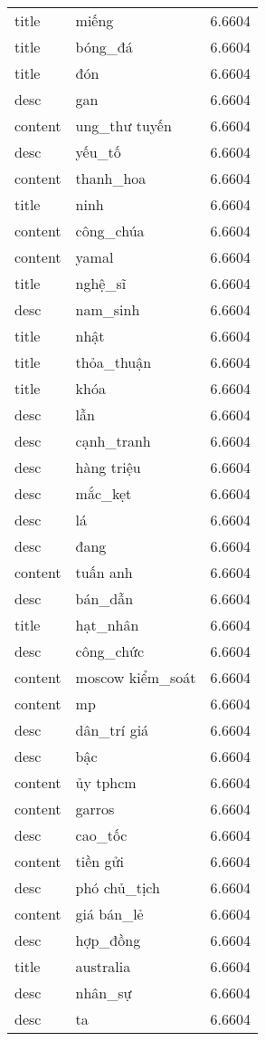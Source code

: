 \documentclass{article}
\begin{document}
\begin{tabular}{lll}
title & miếng & 6.6604\\
title & bóng\_đá & 6.6604\\
title & đón & 6.6604\\
desc & gan & 6.6604\\
content & ung\_thư tuyến & 6.6604\\
desc & yếu\_tố & 6.6604\\
content & thanh\_hoa & 6.6604\\
title & ninh & 6.6604\\
content & công\_chúa & 6.6604\\
content & yamal & 6.6604\\
title & nghệ\_sĩ & 6.6604\\
desc & nam\_sinh & 6.6604\\
title & nhật & 6.6604\\
title & thỏa\_thuận & 6.6604\\
title & khóa & 6.6604\\
desc & lẫn & 6.6604\\
desc & cạnh\_tranh & 6.6604\\
desc & hàng triệu & 6.6604\\
desc & mắc\_kẹt & 6.6604\\
desc & lá & 6.6604\\
desc & đang & 6.6604\\
content & tuấn anh & 6.6604\\
desc & bán\_dẫn & 6.6604\\
title & hạt\_nhân & 6.6604\\
desc & công\_chức & 6.6604\\
content & moscow kiểm\_soát & 6.6604\\
content & mp & 6.6604\\
desc & dân\_trí giá & 6.6604\\
desc & bậc & 6.6604\\
content & ủy tphcm & 6.6604\\
content & garros & 6.6604\\
desc & cao\_tốc & 6.6604\\
content & tiền gửi & 6.6604\\
desc & phó chủ\_tịch & 6.6604\\
content & giá bán\_lẻ & 6.6604\\
desc & hợp\_đồng & 6.6604\\
title & australia & 6.6604\\
desc & nhân\_sự & 6.6604\\
desc & ta & 6.6604\\

\end{tabular}
\end{document}
